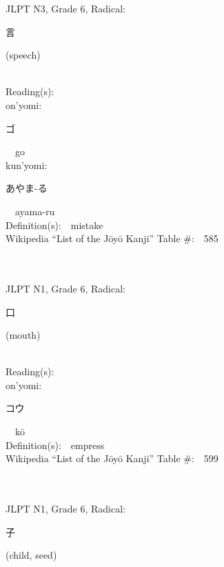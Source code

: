 \begin{multicols}{2}
{JLPT N3, Grade 6, Radical:\ \ {\begin{CJK}{UTF8}{min} 言 \end{CJK}} (speech) } \\
Reading(s):\ \ \\
{\hspace*{1em}}on'yomi:\ \ \\
{\hspace*{2em}}{\begin{CJK}{UTF8}{min} ゴ \end{CJK}}\ \ go\ \ \\
{\hspace*{1em}}kun'yomi:\ \ \\
{\hspace*{2em}}{\begin{CJK}{UTF8}{min} あやま-る \end{CJK}}\ \ ayama-ru\ \ \\
Definition(s):\ \ mistake \\
Wikipedia ``List of the J\=oy\=o Kanji'' Table \#:\ \ 585 \\
\ \ \\
{\fontsize{34pt}{40pt}  }\ \ \\  %
{JLPT N1, Grade 6, Radical:\ \ {\begin{CJK}{UTF8}{min} 口 \end{CJK}} (mouth) } \\
Reading(s):\ \ \\
{\hspace*{1em}}on'yomi:\ \ \\
{\hspace*{2em}}{\begin{CJK}{UTF8}{min} コウ \end{CJK}}\ \ k\=o\ \ \\
Definition(s):\ \ empress \\
Wikipedia ``List of the J\=oy\=o Kanji'' Table \#:\ \ 599 \\
\ \ \\
{\fontsize{34pt}{40pt}  }\ \ \\  %
{JLPT N1, Grade 6, Radical:\ \ {\begin{CJK}{UTF8}{min} 子 \end{CJK}} (child, seed) } \\

\end{multicols}
